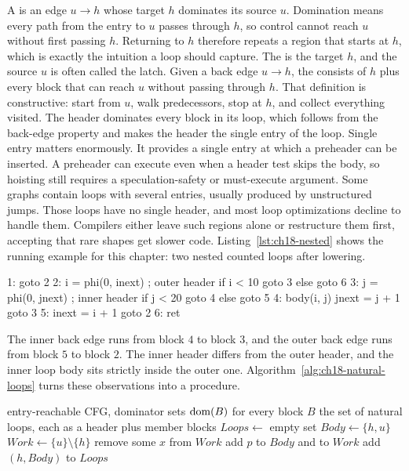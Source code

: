 A  is an edge $u \to h$ whose target $h$ dominates its source $u$.
Domination means every path from the entry to $u$ passes through $h$, so control cannot reach $u$ without first passing $h$.
Returning to $h$ therefore repeats a region that starts at $h$, which is exactly the intuition a loop should capture.
The  is the target $h$, and the source $u$ is often called the latch.
Given a back edge $u \to h$, the  consists of $h$ plus every block that can reach $u$ without passing through $h$.
That definition is constructive: start from $u$, walk predecessors, stop at $h$, and collect everything visited.
The header dominates every block in its loop, which follows from the back-edge property and makes the header the single entry of the loop.
Single entry matters enormously.
It provides a single entry at which a preheader can be inserted.
A preheader can execute even when a header test skips the body, so hoisting still requires a speculation-safety or must-execute argument.
Some graphs contain loops with several entries, usually produced by unstructured jumps.
Those  loops have no single header, and most loop optimizations decline to handle them.
Compilers either leave such regions alone or restructure them first, accepting that rare shapes get slower code.
Listing~\ref{lst:ch18-nested} shows the running example for this chapter: two nested counted loops after lowering.

\begin{irlisting}[caption={Two nested loops with headers at blocks 2 and 3 and back edges from 4 and 5.},label={lst:ch18-nested}]
1: goto 2
2: i = phi(0, inext) ; outer header
   if i < 10 goto 3 else goto 6
3: j = phi(0, jnext) ; inner header
   if j < 20 goto 4 else goto 5
4: body(i, j)
   jnext = j + 1
   goto 3
5: inext = i + 1
   goto 2
6: ret
\end{irlisting}

The inner back edge runs from block $4$ to block $3$, and the outer back edge runs from block $5$ to block $2$.
The inner header differs from the outer header, and the inner loop body sits strictly inside the outer one.
Algorithm~\ref{alg:ch18-natural-loops} turns these observations into a procedure.

\begin{algorithm}
  \caption{Natural loop discovery from back edges}\label{alg:ch18-natural-loops}
  \begin{pseudocode}
    \Require entry-reachable CFG, dominator sets $\operatorname{dom}(B)$ for every block $B$
    \Ensure the set of natural loops, each as a header plus member blocks
    \State $Loops \gets$ empty set
        \State $Body \gets \{h, u\}$
        \State $Work \gets \{u\}\setminus\{h\}$
          \State remove some $x$ from $Work$
              \State add $p$ to $Body$ and to $Work$
            \EndIf
          \EndFor
        \EndWhile
        \State add $(h, Body)$ to $Loops$
      \EndIf
    \EndFor
  \end{pseudocode}
\end{algorithm}

